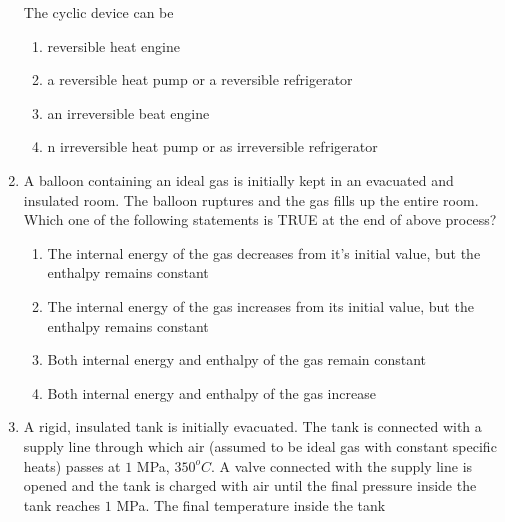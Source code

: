\documentclass[journal]{IEEEtran}
\begin{document}
\begin{enumerate}[start=35]
\begin{figure}[!ht]
\label{fig:my_label}
\end{figure}
    
    The cyclic device can be
    \begin{enumerate}
        \item  reversible heat engine
        \item a reversible heat pump or a reversible refrigerator
        \item an irreversible beat engine
        \item n irreversible heat pump or as irreversible refrigerator
    \end{enumerate}
    \item A balloon containing an ideal gas is initially kept in an evacuated and insulated room. The balloon ruptures and the gas fills up the entire room. Which one of the following statements is TRUE at the end of above process?
    \begin{enumerate}
        \item The internal energy of the gas decreases from it's initial value, but the enthalpy remains constant
        \item The internal energy of the gas increases from its initial value, but the enthalpy remains constant 
        \item Both internal energy and enthalpy of the gas remain constant
        \item Both internal energy and enthalpy of the gas increase
    \end{enumerate}

    \item A rigid, insulated tank is initially evacuated. The tank is connected with a supply line through which air (assumed to be ideal gas with constant specific heats) passes at $1$ MPa, $350^o C$. A valve connected with the supply line is opened and the tank is charged with air until the final pressure inside the tank reaches $1$ MPa. The final temperature inside the tank

    \begin{figure}[!ht]
\centering
{}%


\end{figure}
\end{enumerate}
\end{document}
